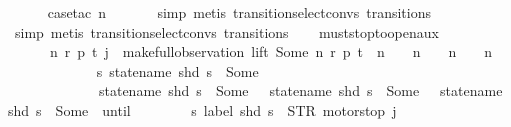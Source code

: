 \begin{isabellebody}
\ \ \ \ \isamarkupfalse%
\ {\isacharparenleft}case{\isacharunderscore}tac\ {\isachardoublequoteopen}n{\isacharequal}{}{\isachardoublequoteclose}{\isacharparenright}\isanewline
\ \ \ \ \ \isamarkupfalse%
\ {\isacharparenleft}simp{\isacharcomma}\ metis\ transition{\isachardot}select{\isacharunderscore}convs{\isacharparenleft}{}{\isacharparenright}\ transitions{\isacharparenleft}{}{\isacharparenright}{\isacharparenright}\isanewline
\ \ \ \ \isamarkupfalse%
\ {\isacharparenleft}simp{\isacharcomma}\ metis\ transition{\isachardot}select{\isacharunderscore}convs{\isacharparenleft}{}{\isacharparenright}\ transitions{\isacharparenleft}{}{\isacharparenright}{\isacharparenright}\isanewline
\ \ \isamarkupfalse%
%
\endisatagproof
{\isafoldproof}%
%
\isadelimproof
\isanewline
%
\endisadelimproof
\isanewline
{}\isamarkupfalse%
\ must{\isacharunderscore}stop{\isacharunderscore}to{\isacharunderscore}open{\isacharunderscore}aux{}{\isacharcolon}\isanewline
\ \ \ \ \ {\isachardoublequoteopen}{\isasymexists}\ n\ r\ p\ t{\isachardot}\ j\ {\isacharequal}\ {\isacharparenleft}make{\isacharunderscore}full{\isacharunderscore}observation\ lift\ {\isacharparenleft}Some\ n{\isacharparenright}\ r\ p\ t{\isacharparenright}\ {\isasymand}\ {\isacharparenleft}n\ {\isacharequal}\ {}\ {\isasymor}\ n\ {\isacharequal}\ {}\ {\isasymor}\ n\ {\isacharequal}\ {}\ {\isasymor}\ n\ {\isacharequal}\ {}{\isacharparenright}{\isachardoublequoteclose}\isanewline
\ \ \ \ \ {\isachardoublequoteopen}\isanewline
\ \ \ \ \ \ \ {\isacharparenleft}{\isacharparenleft}{\isasymlambda}s{\isachardot}\ statename\ {\isacharparenleft}shd\ s{\isacharparenright}\ {\isasymnoteq}\ Some\ {}\ {\isasymand}\isanewline
\ \ \ \ \ \ \ \ \ \ \ \ \ statename\ {\isacharparenleft}shd\ s{\isacharparenright}\ {\isasymnoteq}\ Some\ {}\ {\isasymand}\ statename\ {\isacharparenleft}shd\ s{\isacharparenright}\ {\isasymnoteq}\ Some\ {}\ {\isasymand}\ statename\ {\isacharparenleft}shd\ s{\isacharparenright}\ {\isasymnoteq}\ Some\ {}{\isacharparenright}\ until\isanewline
\ \ \ \ \ \ \ \ {\isacharparenleft}{\isasymlambda}s{\isachardot}\ label\ {\isacharparenleft}shd\ s{\isacharparenright}\ {\isacharequal}\ STR\ {\isacharprime}{\isacharprime}motorstop{\isacharprime}{\isacharprime}{\isacharparenright}{\isacharparenright}\ j{\isachardoublequoteclose}\isanewline
%

\end{isabellebody}
